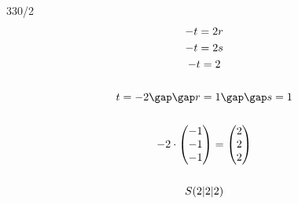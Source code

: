 \begin{exercise}{330/2}
\begin{gather*}
    -t = 2r \\
    -t = 2s \\
    -t = 2 \\\\
    t = -2 \gap\gap r = 1 \gap\gap s = 1 \\\\
    -2 \cdot \begin{pmatrix}-1 \\ -1 \\ -1\end{pmatrix} = \begin{pmatrix}2 \\ 2 \\ 2\end{pmatrix} \\\\
    S(2|2|2)
  \end{gather*}
\end{exercise}
